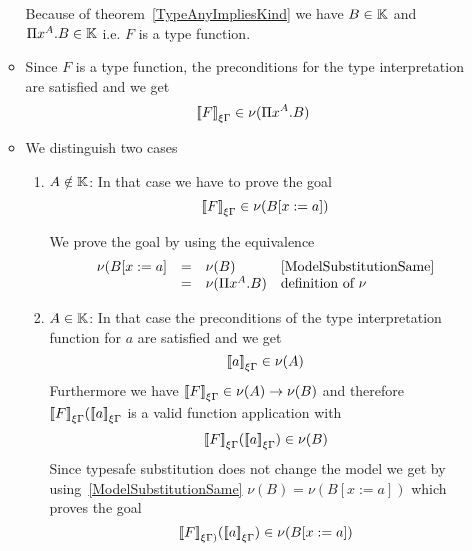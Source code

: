 \begin{definition}
\begin{enumerate}
\begin{itemize}
            Because of theorem~\ref{TypeAnyImpliesKind} we have
            $B \in \mathbb{K}$ and $\Pi x^A . B \in \mathbb{K}$
            i.e. $F$ is a type function.

        \item
            Since $F$ is a type function, the preconditions for the type
                interpretation are satisfied and we get
            $$
                {{[\![} F{]\!]}}_{\xi\Gamma} \in \nu(\Pi x^A.B)
            $$


        \item
            We distinguish two cases
            \begin{enumerate}
            \item $A \notin \mathbb{K}$: In that case we have to prove the goal
                $$
                    {{[\![} F{]\!]}}_{\xi\Gamma} \in \nu(B[x:=a])
                $$

                We prove the goal by using the equivalence
                $$
                \begin{array}{llll}
                    \nu(B[x:=a]
                    &=& \nu(B)
                    &\text{\ref{ModelSubstitutionSame}}
                    \\
                    &=& \nu(\Pi x^A.B)
                    &\text{definition of $\nu$}
                \end{array}
                $$

            \item $A \in \mathbb{K}$: In that case the  preconditions of the type
                interpretation function for $a$ are satisfied and we get
                $$
                    {{[\![} a{]\!]}}_{\xi\Gamma} \in \nu(A)
                $$
                Furthermore we have ${{[\![} F{]\!]}}_{\xi\Gamma} \in \nu(A) \to
                    \nu(B)$ and therefore
                    ${{[\![} F{]\!]}}_{\xi\Gamma}({{[\![} a{]\!]}}_{\xi\Gamma}$ is a
                    valid function application with
                $$
                    {{[\![} F{]\!]}}_{\xi\Gamma}({{[\![} a{]\!]}}_{\xi\Gamma})
                    \in \nu(B)
                $$
                Since typesafe substitution does not change the model we get by
                    using~\ref{ModelSubstitutionSame} $\nu(B) = \nu(B[x:=a])$
                    which proves the goal
                $$
                    {{[\![} F{]\!]}}_{\xi\Gamma)}({{[\![} a{]\!]}}_{\xi\Gamma})
                    \in \nu(B[x:=a])
                $$
            \end{enumerate}
        \end{itemize}
    \end{enumerate}
\end{definition}



